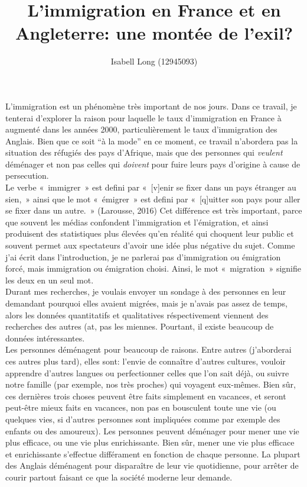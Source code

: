 \documentclass[12pt]{article}
\begin{document}
\title{L'immigration en France et en Angleterre: une montée de l'exil?}
\author{Isabell Long (12945093)}
\maketitle

L'immigration est un phénomène très important de nos jours. Dans ce
travail, je tenterai d'explorer la raison pour laquelle le taux
d'immigration en France à augmenté dans les années 2000,
particulièrement le taux d'immigration des Anglais. Bien que ce soit
``à la mode'' en ce moment, ce travail n'abordera pas la situation des
réfugiés des pays d'Afrique, mais que des personnes qui
\textit{veulent} déménager et non pas celles qui \textit{doivent} pour
fuire leurs pays d'origine à cause de persecution.\\

Le verbe «~immigrer~» est defini par «~[v]enir se fixer dans un pays
étranger au sien,~» ainsi que le mot «~émigrer~» est defini par
«~[q]uitter son pays pour aller se fixer dans un autre.~» (Larousse,
2016) Cet différence est très important, parce que souvent les médias
confondent l'immigration et l'émigration, et ainsi produisent des
statistiques plus élevées qu'en réalité qui choquent leur public et
souvent permet aux spectateurs d'avoir une idée plus négative du
sujet. Comme j'ai écrit dans l'introduction, je ne parlerai pas
d'immigration ou émigration forcé, mais immigration ou émigration
choisi. Ainsi, le mot «~migration~» signifie les deux en un seul
mot.\\

Durant mes recherches, je voulais envoyer un sondage à des
personnes en leur demandant pourquoi elles avaient migrées, mais je
n'avais pas assez de temps, alors les données quantitatifs et
qualitatives réspectivement viennent des recherches des autres (at, pas
les miennes. Pourtant, il existe beaucoup de données intéressantes.\\

Les personnes déménagent pour beaucoup de raisons. Entre autres
(j'aborderai ces autres plus tard), elles sont: l'envie de connaître
d'autres cultures, vouloir apprendre d'autres langues ou perfectionner
celles que l'on sait déjà, ou suivre notre famille (par exemple, nos
très proches) qui voyagent eux-mêmes. Bien sûr, ces dernières trois
choses peuvent être faits simplement en vacances, et seront peut-être
mieux faits en vacances, non pas en bousculent toute une vie (ou
quelques vies, si d'autres personnes sont impliquées comme par exemple
des enfants ou des amoureux). Les personnes peuvent déménager pour
mener une vie plus efficace, ou une vie plus enrichissante. Bien sûr,
mener une vie plus efficace et enrichissante s'effectue différament
en fonction de chaque personne. La plupart des Anglais déménagent pour
disparaître de leur vie quotidienne, pour arrêter de courir partout
faisant ce que la société moderne leur demande.\\
\end{document}
